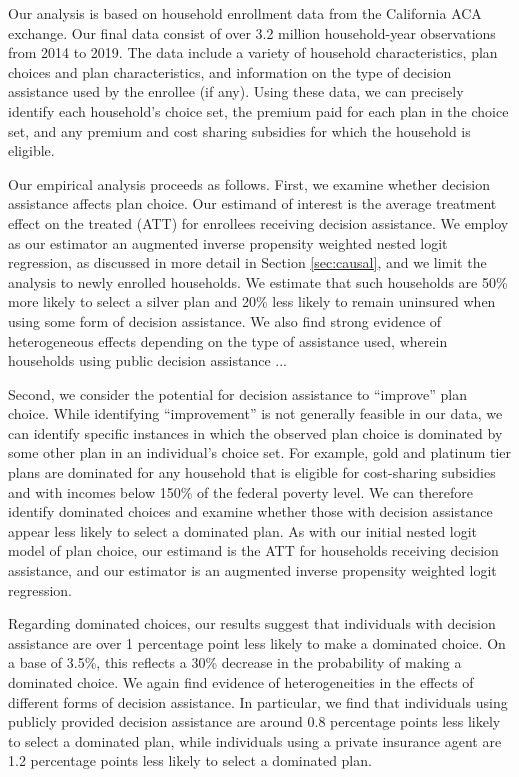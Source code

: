 \documentclass[12pt]{article}
\begin{document}
Our analysis is based on household enrollment data from the California ACA exchange. Our final data consist of over 3.2 million household-year observations from 2014 to 2019. The data include a variety of household characteristics, plan choices and plan characteristics, and information on the type of decision assistance used by the enrollee (if any). Using these data, we can precisely identify each household's choice set, the premium paid for each plan in the choice set, and any premium and cost sharing subsidies for which the household is eligible.

Our empirical analysis proceeds as follows. First, we examine whether decision assistance affects plan choice. Our estimand of interest is the average treatment effect on the treated (ATT) for enrollees receiving decision assistance. We employ as our estimator an augmented inverse propensity weighted nested logit regression, as discussed in more detail in Section \ref{sec:causal}, and we limit the analysis to newly enrolled households. We estimate that such households are 50\% more likely to select a silver plan and 20\% less likely to remain uninsured when using some form of decision assistance. We also find strong evidence of heterogeneous effects depending on the type of assistance used, wherein households using public decision assistance ...

Second, we consider the potential for decision assistance to ``improve'' plan choice. While identifying ``improvement'' is not generally feasible in our data, we can identify specific instances in which the observed plan choice is dominated by some other plan in an individual's choice set. For example, gold and platinum tier plans are dominated for any household that is eligible for cost-sharing subsidies and with incomes below 150\% of the federal poverty level. We can therefore identify dominated choices and examine whether those with decision assistance appear less likely to select a dominated plan. As with our initial nested logit model of plan choice, our estimand is the ATT for households receiving decision assistance, and our estimator is an augmented inverse propensity weighted logit regression. 

Regarding dominated choices, our results suggest that individuals with decision assistance are over 1 percentage point less likely to make a dominated choice. On a base of 3.5\%, this reflects a 30\% decrease in the probability of making a dominated choice. We again find evidence of heterogeneities in the effects of different forms of decision assistance. In particular, we find that individuals using publicly provided decision assistance are around 0.8 percentage points less likely to select a dominated plan, while individuals using a private insurance agent are 1.2 percentage points less likely to select a dominated plan.
\end{document}
